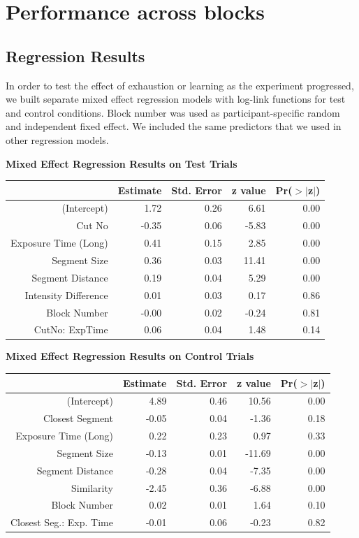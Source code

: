 \documentclass{article}
\begin{document}
\clearpage


\section{Performance across blocks}
\subsection{Regression Results}
In order to test the effect of exhaustion or learning as the experiment progressed, we built separate mixed effect regression models with log-link functions for test and control conditions. Block number was used as participant-specific random and independent fixed effect. We included the same predictors that we used in other regression models.

\textbf{Mixed Effect Regression Results on Test Trials}
\label{table:learningTest}    
\begin{table}[ht]
\centering
\begin{tabular}{rrrrr}
  \hline
 & Estimate & Std. Error & z value & Pr($>$$|$z$|$) \\ 
  \hline
(Intercept) & 1.72 & 0.26 & 6.61 & 0.00 \\ 
  Cut No & -0.35 & 0.06 & -5.83 & 0.00 \\ 
  Exposure Time (Long) & 0.41 & 0.15 & 2.85 & 0.00 \\ 
  Segment Size & 0.36 & 0.03 & 11.41 & 0.00 \\ 
  Segment Distance & 0.19 & 0.04 & 5.29 & 0.00 \\ 
  Intensity Difference & 0.01 & 0.03 & 0.17 & 0.86 \\ 
  Block Number & -0.00 & 0.02 & -0.24 & 0.81 \\ 
  CutNo: ExpTime & 0.06 & 0.04 & 1.48 & 0.14 \\ 
   \hline
\end{tabular}
\end{table}

\textbf{Mixed Effect Regression Results on Control Trials}
\label{table:learningControl}    
\begin{table}[ht]
\centering
\begin{tabular}{rrrrr}
  \hline
 & Estimate & Std. Error & z value & Pr($>$$|$z$|$) \\ 
  \hline
(Intercept) & 4.89 & 0.46 & 10.56 & 0.00 \\ 
  Closest Segment & -0.05 & 0.04 & -1.36 & 0.18 \\ 
  Exposure Time (Long) & 0.22 & 0.23 & 0.97 & 0.33 \\ 
  Segment Size & -0.13 & 0.01 & -11.69 & 0.00 \\ 
  Segment Distance & -0.28 & 0.04 & -7.35 & 0.00 \\ 
  Similarity & -2.45 & 0.36 & -6.88 & 0.00 \\ 
  Block Number & 0.02 & 0.01 & 1.64 & 0.10 \\ 
  Closest Seg.: Exp. Time & -0.01 & 0.06 & -0.23 & 0.82 \\ 
   \hline
\end{tabular}
\end{table}
\clearpage
\end{document}
